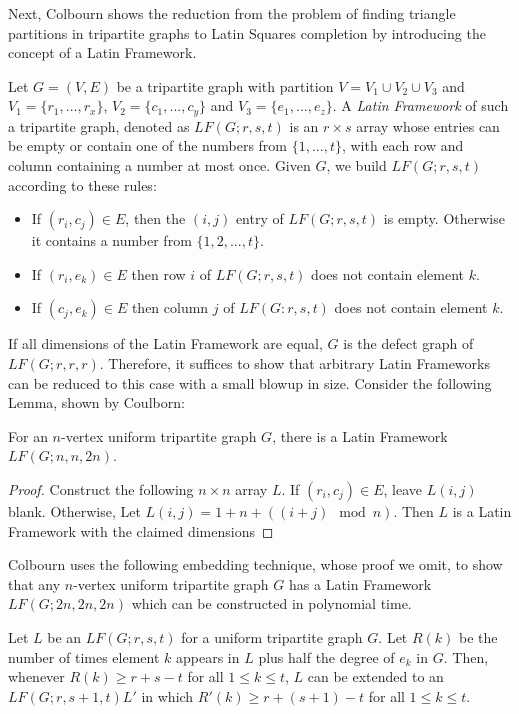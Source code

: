 \documentclass[runningheads,a4paper]{llncs}
\begin{document}
Next, Colbourn shows the reduction from the problem of finding triangle partitions in tripartite graphs to Latin Squares completion by introducing the concept of a Latin Framework. 

\begin{definition} 
Let $G = (V, E)$ be a tripartite graph with partition $V = V_1 \cup V_2 \cup V_3$ and $V_1 = \{r_1,...,r_x\}$, $V_2 = \{c_1,...,c_y\}$ and $V_3 = \{e_1,...,e_z\}$. A \emph{Latin Framework} of such a tripartite graph, denoted as $LF(G;r,s,t)$ is an $r \times s$ array whose entries can be empty or contain one of the numbers from $\{1, ... ,t \}$, with each row and column containing a number at most once. Given $G$, we build $LF(G;r,s,t)$ according to these rules: 

\begin{itemize}
	\item If $(r_i, c_j) \in E$, then the $(i,j)$ entry of $LF(G;r,s,t)$ is empty. Otherwise it contains a number from $\{1,2,...,t\}$. 
	\item If $(r_i, e_k) \in E$ then row $i$ of $LF(G;r,s,t)$ does not contain element $k$. 
	\item If $(c_j, e_k) \in E$ then column $j$ of $LF(G:r,s,t)$ does not contain element $k$. 
\end{itemize}
\end{definition}

If all dimensions of the Latin Framework are equal, $G$ is the defect graph of $LF(G;r ,r, r)$. Therefore, it suffices to show that arbitrary Latin Frameworks can be reduced to this case with a small blowup in size. Consider the following Lemma, shown by Coulborn: 

\begin{lemma}
For an $n$-vertex uniform tripartite graph $G$, there is a Latin Framework $LF(G;n,n,2n)$. 
\end{lemma} 

\begin{proof}
Construct the following $n \times n$ array $L$. If $(r_i, c_j) \in E$, leave $L(i,j)$ blank. Otherwise, Let $L(i,j) = 1 + n + ((i+j) \mod n)$. Then $L$ is a Latin Framework with the claimed dimensions
\end{proof}

Colbourn uses the following embedding technique, whose proof we omit, to show that any $n$-vertex uniform tripartite graph $G$ has a Latin Framework $LF(G;2n,2n,2n)$ which can be constructed in polynomial time. 


\begin{lemma}
Let $L$ be an $LF(G;r,s,t)$ for a uniform tripartite graph $G$. Let $R(k)$ be the number of times element $k$ appears in $L$ plus half the degree of $e_k$ in $G$. Then, whenever $R(k) \geq r + s - t$ for all $1 \leq k \leq t$, $L$ can be extended to an $LF(G;r, s+1, t) L'$ in which $R'(k) \geq r + (s+1) - t$ for all $1 \leq k \leq t$. 
\end{lemma} 
\end{document}
